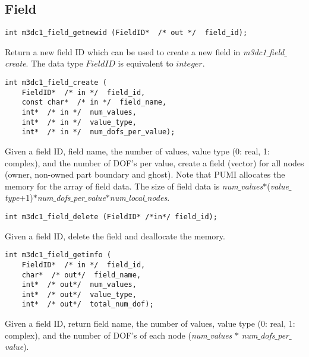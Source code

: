 \subsection{Field}

\begin{verbatim}
int m3dc1_field_getnewid (FieldID*  /* out */  field_id);
\end{verbatim}\vspace{-.5cm}\hspace{1cm}
Return a new field ID which can be used to create a new field in \textit{m3dc1$\_$field$\_$create}. The data type $FieldID$ is equivalent to $integer$.

\begin{verbatim}
int m3dc1_field_create (
    FieldID*  /* in */  field_id, 
    const char*  /* in */  field_name, 
    int*  /* in */  num_values, 
    int*  /* in */  value_type, 
    int*  /* in */  num_dofs_per_value);
\end{verbatim}\vspace{-.5cm}\hspace{1cm}
Given a field ID, field name, the number of values, value type (0: real, 1: complex), and the number of DOF's per value, create a field (vector) for all nodes (owner, non-owned part boundary and ghost). Note that PUMI allocates the memory for the array of field data. The size of field data is \textit{num$\_$values}$*$(\textit{value$\_$type}+1)$*$\textit{num$\_$dofs$\_$per$\_$value}$*$\textit{num$\_$local$\_$nodes}.

\begin{verbatim}
int m3dc1_field_delete (FieldID* /*in*/ field_id); 
\end{verbatim}\vspace{-.5cm}\hspace{1cm}
Given a field ID, delete the field and deallocate the memory.

\begin{verbatim}
int m3dc1_field_getinfo (
    FieldID*  /* in */  field_id, 
    char*  /* out*/  field_name, 
    int*  /* out*/  num_values, 
    int*  /* out*/  value_type, 
    int*  /* out*/  total_num_dof);
\end{verbatim}\vspace{-.5cm}\hspace{1cm}
Given a field ID, return field name, the number of values, value type (0: real, 1: complex), and the number of DOF's of each node (\textit{num$\_$values} $*$ \textit{num$\_$dofs$\_$per$\_$value}).

